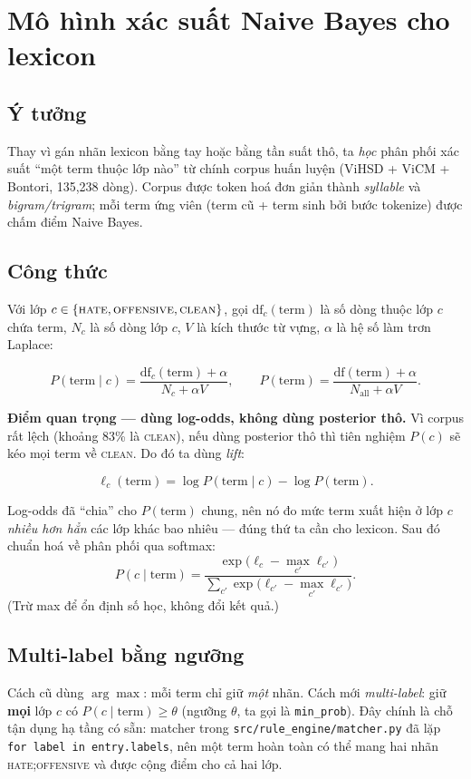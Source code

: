 \documentclass[11pt,a4paper]{article}
\newcommand{\code}[1]{\texttt{\small #1}}
\begin{document}
\section{Mô hình xác suất Naive Bayes cho lexicon}
\label{sec:nb}

\subsection{Ý tưởng}
Thay vì gán nhãn lexicon bằng tay hoặc bằng tần suất thô, ta \emph{học} phân
phối xác suất ``một term thuộc lớp nào'' từ chính corpus huấn luyện
(ViHSD + ViCM + Bontori, 135{,}238 dòng).  Corpus được token hoá đơn giản thành
\emph{syllable} và \emph{bigram/trigram}; mỗi term ứng viên (term cũ + term
sinh bởi bước tokenize) được chấm điểm Naive Bayes.

\subsection{Công thức}
Với lớp $c\in\{\textsc{hate},\textsc{offensive},\textsc{clean}\}$, gọi
$\mathrm{df}_c(\text{term})$ là số dòng thuộc lớp $c$ chứa term, $N_c$ là số dòng
lớp $c$, $V$ là kích thước từ vựng, $\alpha$ là hệ số làm trơn Laplace:

\[
  P(\text{term}\mid c) = \frac{\mathrm{df}_c(\text{term}) + \alpha}{N_c + \alpha V},
  \qquad
  P(\text{term}) = \frac{\mathrm{df}(\text{term}) + \alpha}{N_{\text{all}} + \alpha V}.
\]

\textbf{Điểm quan trọng --- dùng log-odds, không dùng posterior thô.}  Vì corpus
rất lệch (khoảng 83\% là \textsc{clean}), nếu dùng posterior thô thì tiên nghiệm
$P(c)$ sẽ kéo mọi term về \textsc{clean}.  Do đó ta dùng \emph{lift}:

\[
  \ell_c(\text{term}) = \log P(\text{term}\mid c) - \log P(\text{term}).
\]

Log-odds đã ``chia'' cho $P(\text{term})$ chung, nên nó đo mức term xuất hiện ở
lớp $c$ \emph{nhiều hơn hẳn} các lớp khác bao nhiêu --- đúng thứ ta cần cho
lexicon.  Sau đó chuẩn hoá về phân phối qua softmax:
\[
  P(c\mid\text{term}) = \frac{\exp\bigl(\ell_c - \max_{c'}\ell_{c'}\bigr)}
                              {\sum_{c'}\exp\bigl(\ell_{c'} - \max_{c'}\ell_{c'}\bigr)} .
\]
(Trừ max để ổn định số học, không đổi kết quả.)

\subsection{Multi-label bằng ngưỡng}
Cách cũ dùng $\arg\max$: mỗi term chỉ giữ \emph{một} nhãn.  Cách mới
\emph{multi-label}: giữ \textbf{mọi} lớp $c$ có $P(c\mid\text{term}) \ge
\theta$ (ngưỡng $\theta$, ta gọi là \code{min\_prob}).  Đây chính là chỗ tận
dụng hạ tầng có sẵn: matcher trong \code{src/rule\_engine/matcher.py} đã lặp
\code{for label in entry.labels}, nên một term hoàn toàn có thể mang hai nhãn
\textsc{hate;offensive} và được cộng điểm cho cả hai lớp.
\end{document}
